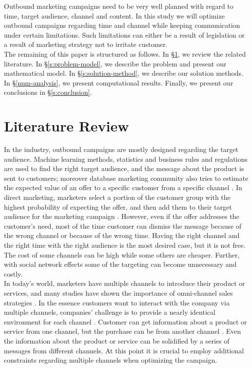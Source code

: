 \documentclass[11pt]{article}
\begin{document}
Outbound marketing campaigns need to be very well planned with regard to time, target audience, channel and content. In this study we will optimize outbound campaigns regarding time and channel while keeping communication under certain limitations. Such limitations can either be a result of legislation or a result of marketing strategy not to irritate customer.\\

The remaining of this paper is structured as follows. In \S \ref{s:literature-review}, we review the related literature. In \S \ref{s:problem-model}, we describe the problem and present our mathematical model. In \S \ref{s:solution-method}, we describe our solution methods. In \S \ref{num-analysis}, we present computational results. Finally, we present our conclusions in \S \ref{s:conclusion}.




\section{Literature Review}  \label{s:literature-review}

In the industry, outbound campaigns are mostly designed regarding the target audience. Machine learning methods, statistics and business rules and regulations are used to find the right target audience, and the message about the product is sent to customers; moreover database marketing community also tries to estimate the expected value of an offer to a specific customer from a specific channel \citep{cohen_exp, oliveira_hypr}. In direct marketing, marketers select a portion of the customer group with the highest probability of expecting the offer, and then add them to their target audience for the marketing campaign \citep{owczarczuk}. However, even if the offer addresses the customer’s need, most of the time customer can dismiss the message because of the wrong channel or because of the wrong time. Having the right channel and the right time with the right audience is the most desired case, but it is not free. The cost of some channels can be high while some others are cheaper. Further, with social network effects some of the targeting can become unnecessary and costly.\\

In today’s world, marketers have multiple channels to introduce their product or services, and many studies have shown the importance of omni-channel sales strategies \citep{shankar, park}. In the essence customers want to interact with the company via multiple channels, companies’ challenge is to provide a nearly identical environment for each channel \citep{bell}. Customer can get information about a product or service from one channel, but the purchase can be from another channel \citep{park}. Even the information about the product or service can be solidified by a series of messages from different channels. At this point it is crucial to employ additional constraints regarding multiple channels when optimizing the campaign.\\
\end{document}
